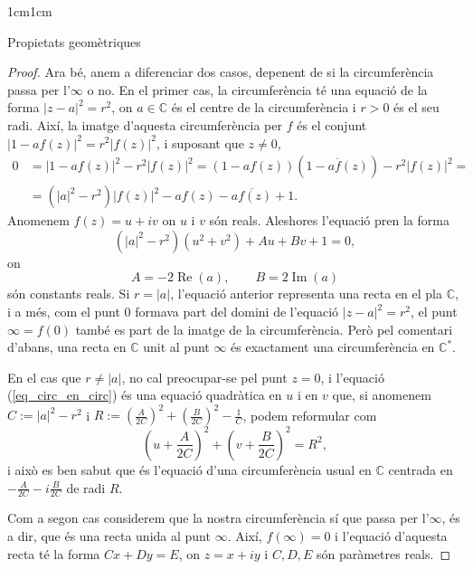 \begin{adjustwidth}{1cm}{1cm}
\begin{subsection}{Propietats geomètriques}
\begin{proof}
        Ara bé, anem a diferenciar dos casos, depenent de si la circumferència passa per l'$\infty$ o no. En el primer cas, la circumferència té una equació de la forma $|z-a|^2=r^2$, on $a\in \mathbb{C}$ és el centre de la circumferència i $r>0$ és el seu radi. Així, la imatge d'aquesta circumferència per $f$ és el conjunt $|1-af(z)|^2=r^2|f(z)|^2$, i suposant que $z\neq 0$, 
        \[
            \begin{aligned}
                0 &= |1-af(z)|^2-r^2|f(z)|^2 = (1-af(z))(\overline{1-af(z)})-r^2|f(z)|^2 = \\
                &= (|a|^2-r^2)|f(z)|^2-af(z)-\overline{af(z)}+1.
            \end{aligned}
        \]
        Anomenem $f(z)=u+iv$ on $u$ i $v$ són reals. Aleshores l'equació pren la forma  
        \begin{equation}
            (|a|^2-r^2)(u^2+v^2)+Au+Bv+1 = 0,
            \label{eq_circ_en_circ}
        \end{equation}
        on 
        \[
            A=-2\operatorname{Re}(a), \qquad B=2\operatorname{Im}(a)
        \]
        són constants reals. Si $r=|a|$, l'equació anterior representa una recta en el pla $\mathbb{C}$, i a més, com el punt $0$ formava part del domini de l'equació $|z-a|^2=r^2$, el punt $\infty=f(0)$ també es part de la imatge de la circumferència. Però pel comentari d'abans, una recta en $\mathbb{C}$ unit al punt $\infty$ és exactament una circumferència en $\mathbb{C}^*$.

        En el cas que $r\neq |a|$, no cal preocupar-se pel punt $z=0$, i l'equació (\ref{eq_circ_en_circ}) és una equació quadràtica en $u$ i en $v$ que, si anomenem $C:=|a|^2-r^2$ i $R:=\left(\frac{A}{2C}\right)^2+\left(\frac{B}{2C}\right)^2-\frac{1}{C}$, podem reformular com 
        \[
            \left(u+\frac{A}{2C}\right)^2+\left(v+\frac{B}{2C}\right)^2=R^2,
        \]
        i això es ben sabut que és l'equació d'una circumferència usual en $\mathbb{C}$ centrada en $-\frac{A}{2C} -i\frac{B}{2C}$ de radi $R$.

        Com a segon cas considerem que la nostra circumferència sí que passa per l'$\infty$, és a dir, que és una recta unida al punt $\infty$. Així, $f(\infty)=0$ i l'equació d'aquesta recta té la forma $Cx+Dy = E$, on $z=x+iy$ i $C,D,E$ són paràmetres reals. 


\end{proof}
\end{subsection}
\end{adjustwidth}
